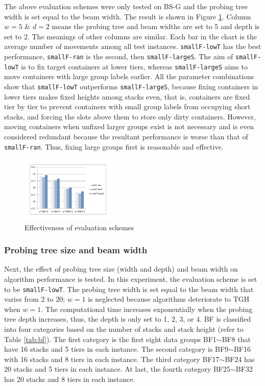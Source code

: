 \documentclass[review,3p,times,authoryear,12pt]{elsarticle}
\begin{document}
The above evaluation schemes were only tested on BS-G and the probing tree width is set equal to the beam width.
The result is shown in Figure \ref{fig7}.
Column $w=5$ \& $d=2$ means the probing tree and beam widths are set to 5 and depth is set to 2.
The meanings of other columns are similar.
Each bar in the chart is the average number of movements among all test instances.
\texttt{smallF-lowT} has the best performance, \texttt{smallF-ran} is the second, then \texttt{smallF-largeS}.
The aim of \texttt{smallF-lowT} is to fix target containers at lower tiers, whereas \texttt{smallF-largeS} aims to move containers with large group labels earlier.
All the parameter combinations show that \texttt{smallF-lowT} outperforms \texttt{smallF-largeS}, because fixing containers in lower tiers makes fixed heights among stacks even, that is, containers are fixed tier by tier to prevent containers with small group labels from occupying short stacks, and forcing the slots above them to store only dirty containers.
However, moving containers when unfixed larger groups exist is not necessary and is even considered redundant because the resultant performance is worse than that of \texttt{smallF-ran}.
Thus, fixing large groups first is reasonable and effective.

\begin{figure}[!htb]
\centering
\includegraphics[width=0.4\textwidth]{fig7.pdf}
\caption{Effectiveness of evaluation schemes}
\label{fig7}
\end{figure}

\subsubsection{Probing tree size and beam width}

Next, the effect of probing tree size (width and depth) and beam width on algorithm performance is tested.
In this experiment, the evaluation scheme is set to be \texttt{smallF-lowT}.
The probing tree width is set equal to the beam width that varies from 2 to 20; $w=1$ is neglected because algorithms deteriorate to TGH when $w=1$.
The computational time increases exponentially when the probing tree depth increases, thus, the depth is only set to 1, 2, 3, or 4.
BF is classified into four categories based on the number of stacks and stack height (refer to Table \ref{tab:bf}).
The first category is the first eight data groups BF1$\sim$BF8 that have 16 stacks and 5 tiers in each instance.
The second category is BF9$\sim$BF16 with 16 stacks and 8 tiers in each instance.
The third category BF17$\sim$BF24 has 20 stacks and 5 tiers in each instance.
At last, the fourth category BF25$\sim$BF32 has 20 stacks and 8 tiers in each instance.
\end{document}

